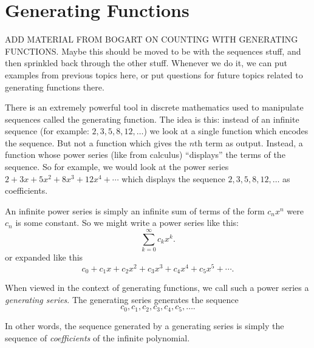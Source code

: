 \documentclass[10pt,]{book}
\theoremstyle{plain}
\theoremstyle{definition}
\theoremstyle{definition}
\theoremstyle{definition}
\theoremstyle{definition}
\numberwithin{equation}{chapter}
\begin{document}
\section[{Generating Functions}]{Generating Functions}\label{section-12}
\hypertarget{p-950}{}%
ADD MATERIAL FROM BOGART ON COUNTING WITH GENERATING FUNCTIONS. Maybe this should be moved to be with the sequences stuff, and then sprinkled back through the other stuff.  Whenever we do it, we can put examples from previous topics here, or put questions for future topics related to generating functions there.%
\par
\hypertarget{p-951}{}%
There is an extremely powerful tool in discrete mathematics used to manipulate sequences called the generating function. The idea is this: instead of an infinite sequence (for example: \(2, 3, 5, 8, 12, \ldots\)) we look at a single function which encodes the sequence. But not a function which gives the \(n\)th term as output. Instead, a function whose power series (like from calculus) ``displays'' the terms of the sequence. So for example, we would look at the power series \(2 + 3x + 5x^2 + 8x^3 + 12x^4 + \cdots\) which displays the sequence \(2, 3, 5, 8, 12, \ldots\) as coefficients.%
\par
\hypertarget{p-952}{}%
An infinite power series is simply an infinite sum of terms of the form \(c_nx^n\) were \(c_n\) is some constant. So we might write a power series like this:%
\begin{equation*}
\sum_{k=0}^\infty c_k x^k.
\end{equation*}
or expanded like this%
\begin{equation*}
c_0 + c_1x + c_2x^2 + c_3x^3 + c_4x^4 + c_5x^5 + \cdots.
\end{equation*}
%
\par
\hypertarget{p-953}{}%
When viewed in the context of generating functions, we call such a power series a \emph{generating series}. The generating series generates the sequence%
\begin{equation*}
c_0, c_1, c_2, c_3, c_4, c_5, \ldots.
\end{equation*}
%
\par
\hypertarget{p-954}{}%
In other words, the sequence generated by a generating series is simply the sequence of \emph{coefficients} of the infinite polynomial.%
\end{document}
